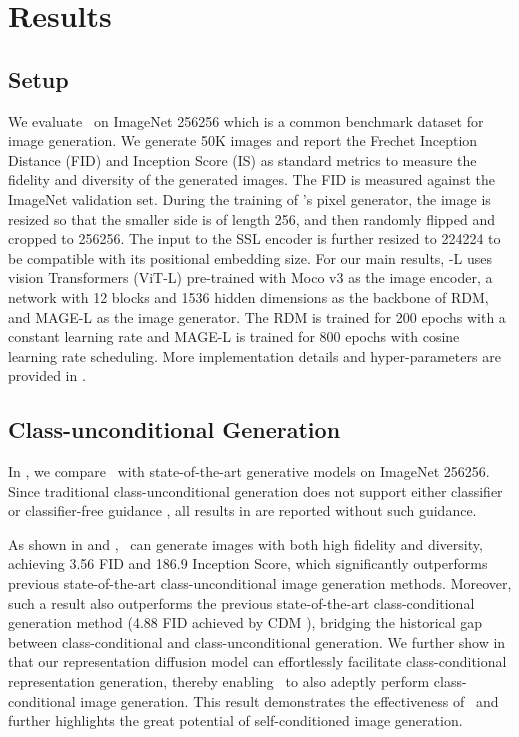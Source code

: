 \section{Results}

\subsection{Setup}
We evaluate \name~on ImageNet 256256 \cite{deng2009imagenet} which is a common benchmark dataset for image generation. We generate 50K images and report the Frechet Inception Distance (FID) \cite{heusel2017gans} and Inception Score (IS) \cite{salimans2016improved} as standard metrics to measure the fidelity and diversity of the generated images. The FID is measured against the ImageNet validation set. During the training of \name's pixel generator, the image is resized so that the smaller side is of length 256, and then randomly flipped and cropped to 256256. The input to the SSL encoder is further resized to 224224 to be compatible with its positional embedding size. For our main results, \name-L uses vision Transformers (ViT-L) \cite{vit} pre-trained with Moco v3 \cite{chen2021empirical} as the image encoder, a network with 12 blocks and 1536 hidden dimensions as the backbone of RDM, and MAGE-L \cite{li2023mage} as the image generator. The RDM is trained for 200 epochs with a constant learning rate and MAGE-L is trained for 800 epochs with cosine learning rate scheduling. More implementation details and hyper-parameters are provided in .

\subsection{Class-unconditional Generation}
\label{sec:main-results}

In , we compare \name~with state-of-the-art generative models on ImageNet 256256. Since traditional class-unconditional generation does not support either classifier or classifier-free guidance \cite{dhariwal2021diffusion, ho2022classifier}, all results in  are reported without such guidance.

As shown in  and , \name~can generate images with both high fidelity and diversity, achieving 3.56 FID and 186.9 Inception Score, which significantly outperforms previous state-of-the-art class-unconditional image generation methods. Moreover, such a result also outperforms the previous state-of-the-art class-conditional generation method (4.88 FID achieved by CDM \cite{ho2022cascaded}), bridging the historical gap between class-conditional and class-unconditional generation. We further show in  that our representation diffusion model can effortlessly facilitate class-conditional representation generation, thereby enabling \name~to also adeptly perform class-conditional image generation. This result demonstrates the effectiveness of \name~and further highlights the great potential of self-conditioned image generation.


